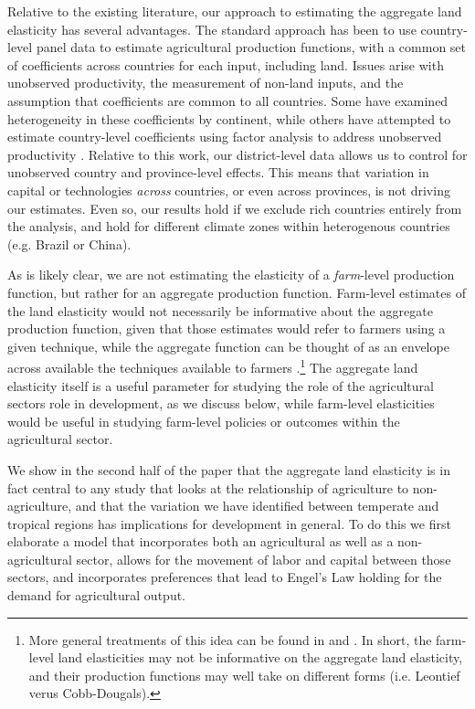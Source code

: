 \documentclass[11pt]{article}
\begin{document}
Relative to the existing literature, our approach to estimating the aggregate land elasticity has several advantages. The standard approach has been to use country-level panel data \citep{Hayami:1970ly,Hayami:1985cr,cpr1997,mm2001,Mundlak:2000dq,mbl2012,et2013mango} to estimate agricultural production functions, with a common set of coefficients across countries for each input, including land. Issues arise with unobserved productivity, the measurement of non-land inputs, and the assumption that coefficients are common to all countries. Some have examined heterogeneity in these coefficients \citep{gg2003,Wiebe2003Resource-Qualit} by continent, while others have attempted to estimate country-level coefficients using factor analysis to address unobserved productivity \citep{et2013mango,ev2016clim}. Relative to this work, our district-level data allows us to control for unobserved country and province-level effects. This means that variation in capital or technologies \textit{across} countries, or even across provinces, is not driving our estimates. Even so, our results hold if we exclude rich countries entirely from the analysis, and hold for different climate zones within heterogenous countries (e.g. Brazil or China).

As is likely clear, we are not estimating the elasticity of a \textit{farm}-level production function, but rather for an aggregate production function. Farm-level estimates of the land elasticity would not necessarily be informative about the aggregate production function, given that those estimates would refer to farmers using a given technique, while the aggregate function can be thought of as an envelope across available the techniques available to farmers \citep{Hayami:1970ly}.\footnote{More general treatments of this idea can be found in \citet{houthakker1955} and \citet{jones2005}. In short, the farm-level land elasticities may not be informative on the aggregate land elasticity, and their production functions may well take on different forms (i.e. Leontief verus Cobb-Dougals).} The aggregate land elasticity itself is a useful parameter for studying the role of the agricultural sectors role in development, as we discuss below, while farm-level elasticities would be useful in studying farm-level policies or outcomes within the agricultural sector.

We show in the second half of the paper that the aggregate land elasticity is in fact central to any study that looks at the relationship of agriculture to non-agriculture, and that the variation we have identified between temperate and tropical regions has implications for development in general. To do this we first elaborate a model that incorporates both an agricultural as well as a non-agricultural sector, allows for the movement of labor and capital between those sectors, and incorporates preferences that lead to Engel's Law holding for the demand for agricultural output. 
\end{document}
